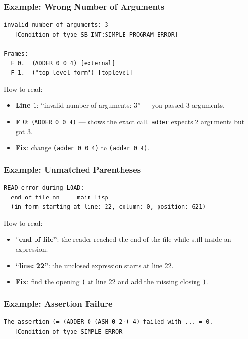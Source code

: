 \subsubsection{Example: Wrong Number of Arguments}

\begin{lstlisting}
invalid number of arguments: 3
   [Condition of type SB-INT:SIMPLE-PROGRAM-ERROR]

Frames:
  F 0.  (ADDER 0 0 4) [external]
  F 1.  ("top level form") [toplevel]
\end{lstlisting}

How to read:
\begin{itemize}
  \item \textbf{Line 1}: ``invalid number of arguments: 3''
        --- you passed 3 arguments.
  \item \textbf{F 0}: \texttt{(ADDER 0 0 4)} --- shows the exact call.
        \texttt{adder} expects 2 arguments but got 3.
  \item \textbf{Fix}: change \texttt{(adder 0 0 4)} to \texttt{(adder 0 4)}.
\end{itemize}

\subsubsection{Example: Unmatched Parentheses}

\begin{lstlisting}
READ error during LOAD:
  end of file on ... main.lisp
  (in form starting at line: 22, column: 0, position: 621)
\end{lstlisting}

How to read:
\begin{itemize}
  \item \textbf{``end of file''}: the reader reached the end of the file
        while still inside an expression.
  \item \textbf{``line: 22''}: the unclosed expression starts at line 22.
  \item \textbf{Fix}: find the opening \texttt{(} at line 22 and add
        the missing closing \texttt{)}.
\end{itemize}

\subsubsection{Example: Assertion Failure}

\begin{lstlisting}
The assertion (= (ADDER 0 (ASH 0 2)) 4) failed with ... = 0.
   [Condition of type SIMPLE-ERROR]
\end{lstlisting}


